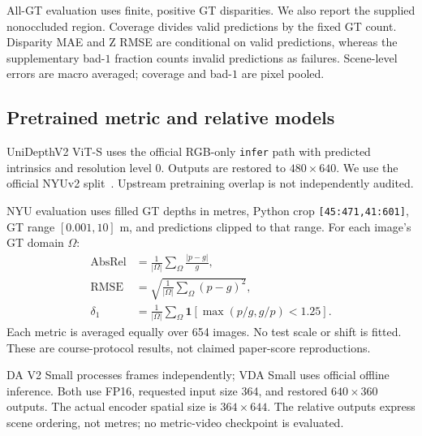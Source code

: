 \documentclass[10pt,twocolumn,letterpaper]{article}
\begin{document}
All-GT evaluation uses finite, positive GT disparities. We also report the supplied nonoccluded region. Coverage divides valid predictions by the fixed GT count. Disparity MAE and Z RMSE are conditional on valid predictions, whereas the supplementary bad-$1$ fraction counts invalid predictions as failures. Scene-level errors are macro averaged; coverage and bad-$1$ are pixel pooled.

\subsection{Pretrained metric and relative models}
UniDepthV2 ViT-S uses the official RGB-only \texttt{infer} path with predicted intrinsics and resolution level 0. Outputs are restored to $480\times640$. We use the official NYUv2 split~\cite{nyu}. Upstream pretraining overlap is not independently audited.

NYU evaluation uses filled GT depths in metres, Python crop \texttt{[45:471,41:601]}, GT range $[0.001,10]$ m, and predictions clipped to that range. For each image's GT domain $\Omega$:
\begin{align}
\mathrm{AbsRel}&=\frac{1}{|\Omega|}\sum_{\Omega}\frac{|p-g|}{g},\\
\mathrm{RMSE}&=\sqrt{\frac{1}{|\Omega|}\sum_{\Omega}(p-g)^2},\\
\delta_1&=\frac{1}{|\Omega|}\sum_{\Omega}
\mathbf{1}\!\left[\max(p/g,g/p)<1.25\right].
\end{align}
Each metric is averaged equally over 654 images. No test scale or shift is fitted. These are course-protocol results, not claimed paper-score reproductions.

DA V2 Small processes frames independently; VDA Small uses official offline inference. Both use FP16, requested input size 364, and restored $640\times360$ outputs. The actual encoder spatial size is $364\times644$. The relative outputs express scene ordering, not metres; no metric-video checkpoint is evaluated.
\end{document}
